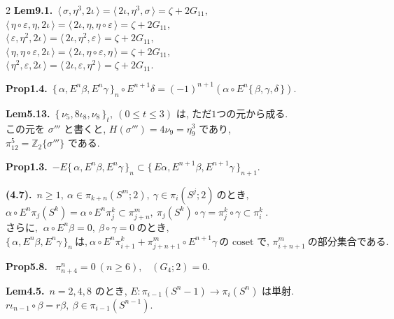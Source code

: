 \documentclass[10pt, leqno]{ltjsarticle}
\newcommand{\toda}[1]{\{\,#1\,\}}              %
\newcommand{\todai}[2][]{\{\,#2\,\}_{#1}}      %
\newcommand{\todas}[1]{\langle\,#1\,\rangle}
\newcommand{\gen}[1]{\{#1\}}       %
\newcommand{\pis}[2]{\pi_{#1}(#2)}       %
\newcommand{\pit}[2]{\pi_{#1}^{#2}}
\numberwithin{equation}{section}
\theoremstyle{plain}
\theoremstyle{definition}
\theoremstyle{remark}
\begin{document}
\begin{paracol}{2}
\noindent
\textbf{Lem9.1.}\
\(\todas{\sigma,\eta^{3},2\iota}=\todas{2\iota,\eta^{3},\sigma}=\zeta+2G_{11},\)\\
\(\todas{\eta\circ\varepsilon,\eta,2\iota}=\todas{2\iota,\eta,\eta\circ\varepsilon}=\zeta+2G_{11},\)\\
\(\todas{\varepsilon,\eta^{2},2\iota}=\todas{2\iota,\eta^{2},\varepsilon}=\zeta+2G_{11},\)\\
\(\todas{\eta,\eta\circ\varepsilon,2\iota}=\todas{2\iota,\eta\circ\varepsilon,\eta}=\zeta+2G_{11},\)\\
\(\todas{\eta^{2},\varepsilon,2\iota}=\todas{2\iota,\varepsilon,\eta^{2}}=\zeta+2G_{11}.\)

\noindent
\textbf{Prop1.4.}\
\(\todai[n]{\alpha, E^n\beta, E^n\gamma}\circ E^{n+1}\delta
= (-1)^{n+1}(\alpha\circ E^n\toda{\beta, \gamma, \delta})\).

\noindent
\textbf{Lem5.13.}\
\(\todai[t]{\nu_5,8\iota_8,\nu_8},\ (0\leq t\leq3)\) 
は, ただ$1$つの元から成る. \\
この元を \(\sigma'''\) と書くと, 
\(H(\sigma''')=4\nu_9=\eta_9^3\) であり, \\
\(\pi_{12}^5=\mathbb{Z}_2\gen{\sigma'''}\)
である. 

\noindent
\textbf{Prop1.3.}\
\(-E\todai[n]{\alpha, E^n\beta, E^n\gamma}
\subset \todai[n+1]{E\alpha, E^{n+1}\beta, E^{n+1}\gamma}\).

\noindent
\textbf{(4.7).}\
\(n\ge1, \ \alpha\in\pis{k+n}{S^m; 2},\ \gamma\in\pis{i}{S^j; 2}
\ \text{のとき, }\)\\
\(\alpha\circ E^n\pis{j}{S^k} = \alpha\circ E^n \pit{j}{k}
\subset \pit{j+n}{m},
\ \pis{j}{S^k}\circ\gamma = \pit{j}{k}\circ\gamma \subset\pit{i}{k}\ . \)\\
\(\text{さらに, }\ \alpha\circ E^n\beta=0,\ \beta\circ\gamma = 0 \ \text{のとき, }\)\\
\(\todai[n]{\alpha, E^n\beta, E^n\gamma}\ \text{は,}\
\alpha\circ E^n\pit{i+1}{k} + \pit{j+n+1}{m}\circ E^{n+1}\gamma\
\text{の coset で, }\pit{i+n+1}{m} \ \text{の部分集合である. }\)

\noindent
\textbf{Prop5.8.}\
\(\pi^{n}_{n+4}=0\ (n\ge6),\) \
\((G_{4};2)=0.\)

\noindent
\textbf{Lem4.5.}\
\(n=2,4,8\) のとき, 
\(E:\pis{i-1}{S^n-1}\to\pis{i}{S^n}\) は単射.\\ 
\(r\iota_{n-1}\circ\beta = r\beta,\ \beta\in\pis{i-1}{S^{n-1}}\).



\end{paracol}
\end{document}
